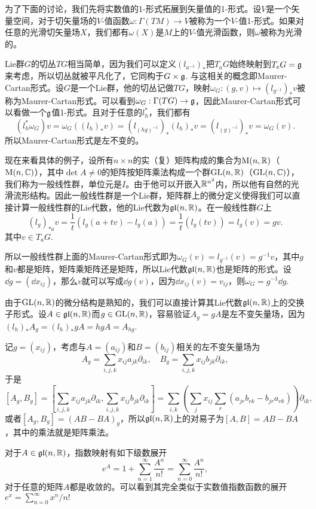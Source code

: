 \para 为了下面的讨论，我们先将实数值的1-形式拓展到矢量值的1-形式。设$V$是一个矢量空间，对于切矢量场的$V$-值函数$\omega:\Gamma(TM)\to V$被称为一个$V$-值1-形式。如果对任意的光滑切矢量场$X$，我们都有$\omega(X)$是$M$上的$V$-值光滑函数，则$\omega$被称为光滑的。

\para Lie群$G$的切丛$TG$相当简单，因为我们可以定义$(l_{a^{-1}})_*$把$T_aG$始终映射到$T_eG={\mathfrak{g}}$来考虑，所以切丛就被平凡化了，它同构于$G\times {\mathfrak{g}}$. 与这相关的概念即Maurer-Cartan形式。设$G$是一个Lie群，他的切丛记做$TG$，映射$\omega_G:(g,v)\mapsto (l_{g^{-1}})_*v$被称为Maurer-Cartan形式。可以看到$\omega_G:\Gamma(TG)\to {\mathfrak{g}}$，因此Maurer-Cartan形式可以看做一个${\mathfrak{g}}$值1-形式。且对于任意的$l_h^*$，我们都有
\[
	(l_h^*\omega_G)v=\omega_G((l_h)_*v)=(l_{(hg)^{-1}})_*(l_h)_*v=(l_{(g)^{-1}})_*v=\omega_G(v).
\]
所以Maurer-Cartan形式是左不变的。

\para 现在来看具体的例子，设所有$n\times n$的实（复）矩阵构成的集合为$\mathrm{M}(n,\mathbb{R})$（$\mathrm{M}(n,\mathbb{C})$），其中$\det A\neq 0$的矩阵按矩阵乘法构成一个群$\mathrm{GL}(n,\mathbb{R})$（$\mathrm{GL}(n,\mathbb{C})$），我们称为一般线性群，单位元是$I$。由于他可以开嵌入$\mathbb{R}^{n^2}$内，所以他有自然的光滑流形结构。因此一般线性群是一个Lie群，矩阵群上的微分定义使得我们可以直接计算一般线性群的Lie代数，他的Lie代数为$\mathfrak{gl}(n,\mathbb{R})$。在一般线性群$G$上
\[
	(l_g)_{*a}v=\frac{1}{t}(l_g(a+tv)-l_g(a))
	=\frac{1}{t}(l_g(tv))=l_g(v)=gv.
\]
其中$v\in T_aG$.

所以一般线性群上面的Maurer-Cartan形式即为$\omega_G(v)=l_{g^{-1}}(v)=g^{-1}v$，其中$g$和$v$都是矩阵，矩阵乘矩阵还是矩阵，所以Lie代数$\mathfrak{gl}(n,\mathbb{R})$也是矩阵的形式。设$\dd g=(\dd x_{ij})$，那么$v$就可以写成$\dd g(v)$，因为$\dd x_{ij}(v)=v_{ij}$，则$\omega_G=g^{-1}\dd g$.

由于$\mathrm{GL}(n,\mathbb{R})$的微分结构是熟知的，我们可以直接计算其Lie代数$\mathfrak{gl}(n,\mathbb{R})$上的交换子形式。设$A\in\mathfrak{gl}(n,\mathbb{R})$而$g\in\mathrm{GL}(n,\mathbb{R})$，容易验证$A_g=gA$是左不变矢量场，因为$(l_h)_{*}A_g=(l_h)_{*}gA=hgA=A_{hg}$.

记$g=(x_{ij})$，考虑与$A=(a_{ij})$和$B=(b_{ij})$相关的左不变矢量场为
\[
A_g=\sum_{i,j,k}x_{ij}a_{jk}\partial_{ik},\quad B_g=\sum_{i,j,k}x_{ij}b_{jk}\partial_{ik},
\]
于是
\[
[A_g,B_g]=\left[\sum_{i,j,k}x_{ij}a_{jk}\partial_{ik},\sum_{i,j,k}x_{ij}b_{jk}\partial_{ik}\right]=\sum_{i,k}\left(\sum_{j}x_{ij}\sum_{r}(a_{jr}b_{rk}-b_{jr}a_{rk})\right)\partial_{ik},
\]
或者$[A_g,B_g]=(AB-BA)_g$，所以$\mathfrak{gl}(n,\mathbb{R})$上的对易子为$[A,B]=AB-BA$，其中的乘法就是矩阵乘法。

\para 对于$A\in\mathfrak{gl}(n,\mathbb{R})$，指数映射有如下级数展开
\[
	e^A=1+\sum_{n=1}^\infty \frac{A^n}{n!}=\sum_{n=0}^\infty \frac{A^n}{n!},
\]
对于任意的矩阵$A$都是收敛的。可以看到其完全类似于实数值指数函数的展开$e^x=\sum_{n=0}^\infty x^n/n!$

